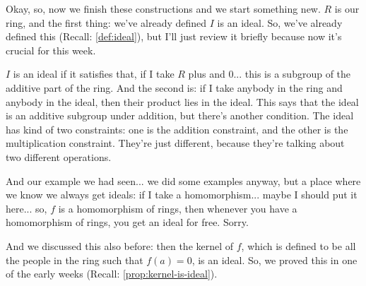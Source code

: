 \begin{speech}[00:16:29 - 00:18:33]
Okay, so, now we finish these constructions and we start something new. $R$ is our ring,  and the first thing: we've already defined $I$ is an ideal.  So, we've already defined this (Recall: \cref{def:ideal}), but I'll just review it briefly because now it's crucial for this week. 

$I$ is an ideal if it satisfies that, if I take $R$ plus and $0$... this is a subgroup of the additive part of the ring.  And the second is: if I take anybody in the ring and anybody in the ideal, then their product lies in the ideal.  This says that the ideal is an additive subgroup under addition, but there's another condition. The ideal has kind of two constraints: one is the addition constraint, and the other is the multiplication constraint. They're just different, because they're talking about two different operations.

And our example we had seen... we did some examples anyway, but a place where we know we always get ideals: if I take a homomorphism...  maybe I should put it here... so, $f$ is a homomorphism of rings,  then whenever you have a homomorphism of rings, you get an ideal for free. Sorry. 

And we discussed this also before: then the kernel of $f$, which is defined to be all the people in the ring such that $f(a) = 0$, is an ideal.  So, we proved this in one of the early weeks (Recall: \cref{prop:kernel-is-ideal}).
\end{speech}

